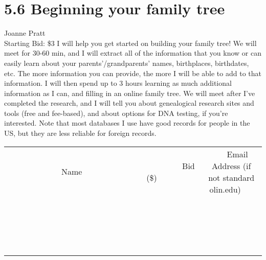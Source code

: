 \documentclass[11pt]{article}
\begin{document}
\section*{5.6 Beginning your family tree}
Joanne Pratt
\\
Starting Bid: \$3
\newline
I will help you get started on building your family tree!  We will meet for 30-60 min, and I will extract all of the information that you know or can easily learn about your parents'/grandparents' names, birthplaces, birthdates, etc.  The more information you can provide, the more I will be able to add to that information. I will then spend up to 3 hours learning as much additional information as I can, and filling in an online family tree.  We will meet after I've completed the research, and I will tell you about genealogical research sites and tools (free and fee-based), and about options for DNA testing, if you're interested.  Note that most databases I use have good records for people in the US, but they are less reliable for foreign records.
\\[3ex]
\begin{tabular}{c c c}
~~~~~~~~~~~~~Name~~~~~~~~~~~~~ & ~~~~~~~~~Bid (\$)~~~~~~~~~  & ~~~Email Address (if not standard olin.edu)~~~\\
 & & \\
\hline
 & & \\
\hline
 & & \\
\hline
 & & \\
\hline
 & & \\
\hline
 & & \\
\hline
 & & \\
\hline
 & & \\
\hline
 & & \\
\hline
 & & \\
\hline
 & & \\
\hline
 & & \\
\hline
 & & \\
\hline
 & & \\
\hline
 & & \\
\hline
 & & \\
\hline
 & & \\
\hline
 & & \\
\hline
 & & \\
\hline
\end{tabular}
\newpage
\end{document}
